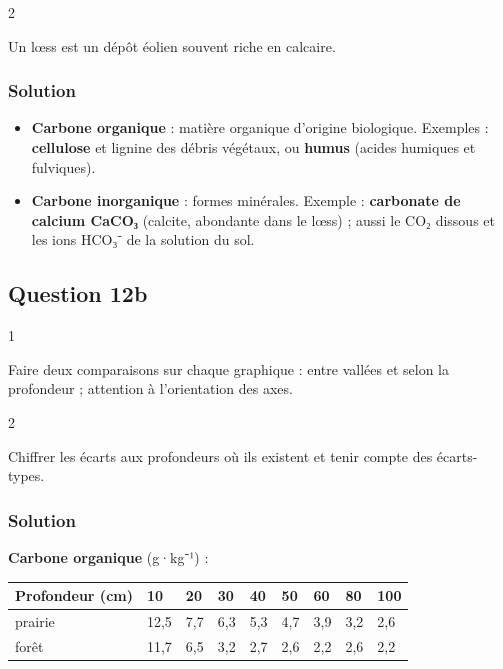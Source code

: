 \documentclass[11pt,a4paper]{article}
\providecommand{\tightlist}{\setlength{\itemsep}{0pt}\setlength{\parskip}{0pt}}
\begin{document}
\begin{indication}{2}

Un lœss est un dépôt éolien souvent riche en calcaire.

\end{indication}

\hypertarget{solution-31}{%
\subsubsection{Solution}\label{solution-31}}

\begin{itemize}
\tightlist
\item
  \textbf{Carbone organique} : matière organique d'origine biologique. Exemples : \textbf{cellulose} et lignine des débris végétaux, ou \textbf{humus} (acides humiques et fulviques).
\item
  \textbf{Carbone inorganique} : formes minérales. Exemple : \textbf{carbonate de calcium CaCO₃} (calcite, abondante dans le lœss) ; aussi le CO₂ dissous et les ions HCO₃⁻ de la solution du sol.
\end{itemize}

\hypertarget{question-12b}{%
\subsection{Question 12b}\label{question-12b}}

\begin{indication}{1}

Faire deux comparaisons sur chaque graphique : entre vallées et selon la profondeur ; attention à l'orientation des axes.

\end{indication}

\begin{indication}{2}

Chiffrer les écarts aux profondeurs où ils existent et tenir compte des écarts-types.

\end{indication}

\hypertarget{solution-32}{%
\subsubsection{Solution}\label{solution-32}}

\textbf{Carbone organique} (g·kg⁻¹) :

\begin{longtable}[]{@{}lllllllll@{}}
\toprule\noalign{}
Profondeur (cm) & 10 & 20 & 30 & 40 & 50 & 60 & 80 & 100 \\
\midrule\noalign{}
\endhead
\bottomrule\noalign{}
\endlastfoot
prairie & 12,5 & 7,7 & 6,3 & 5,3 & 4,7 & 3,9 & 3,2 & 2,6 \\
forêt & 11,7 & 6,5 & 3,2 & 2,7 & 2,6 & 2,2 & 2,6 & 2,2 \\
\end{longtable}
\end{document}
